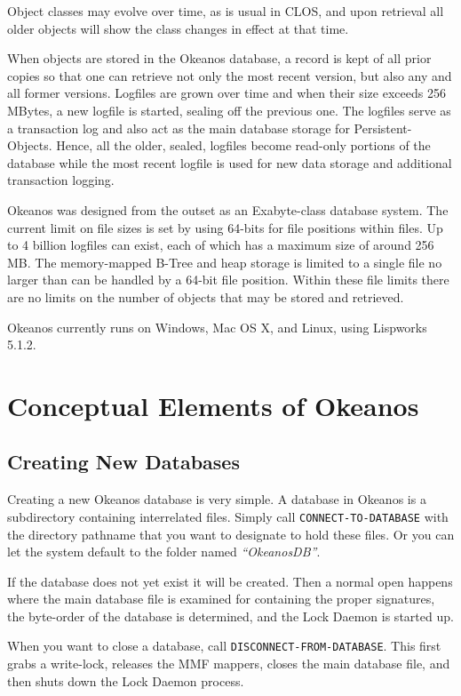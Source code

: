 \documentclass[article,oneside]{memoir}
\begin{document}
Object classes may evolve over time, as is usual in CLOS, and upon retrieval all older objects will show the class changes in effect at that time.

When objects are stored in the Okeanos database, a record is kept of all prior copies so that one can retrieve not only the most recent version, but also any and all former versions. Logfiles are grown over time and when their size exceeds 256 MBytes, a new logfile is started, sealing off the previous one. The logfiles serve as a transaction log and also act as the main database storage for {\ttfamily Persistent-Object}s. Hence, all the older, sealed, logfiles become read-only portions of the database while the most recent logfile is used for new data storage and additional transaction logging.

Okeanos was designed from the outset as an Exabyte-class database system. The current limit on file sizes is set by using 64-bits for file positions within files. Up to 4 billion logfiles can exist, each of which has a maximum size of around 256 MB. The memory-mapped B-Tree and heap storage is limited to a single file no larger than can be handled by a 64-bit file position. Within these file limits there are no limits on the number of objects that may be stored and retrieved.

Okeanos currently runs on Windows, Mac OS X, and Linux, using Lispworks 5.1.2.

\chapter{Conceptual Elements of Okeanos}
\section{Creating New Databases}
Creating a new Okeanos database is very simple. A database in Okeanos is a subdirectory containing interrelated files. Simply call \texttt{CONNECT-TO-DATABASE} with the directory pathname that you want to designate to hold these files. Or you can let the system default to the folder named \textit{``OkeanosDB''}.

If the database does not yet exist it will be created. Then a normal open happens where the main database file is examined for containing the proper signatures, the byte-order of the database is determined, and the Lock Daemon is started up.

When you want to close a database, call \texttt{DISCONNECT-FROM-DATABASE}. This first grabs a write-lock, releases the MMF mappers, closes the main database file, and then shuts down the Lock Daemon process.
\end{document}
